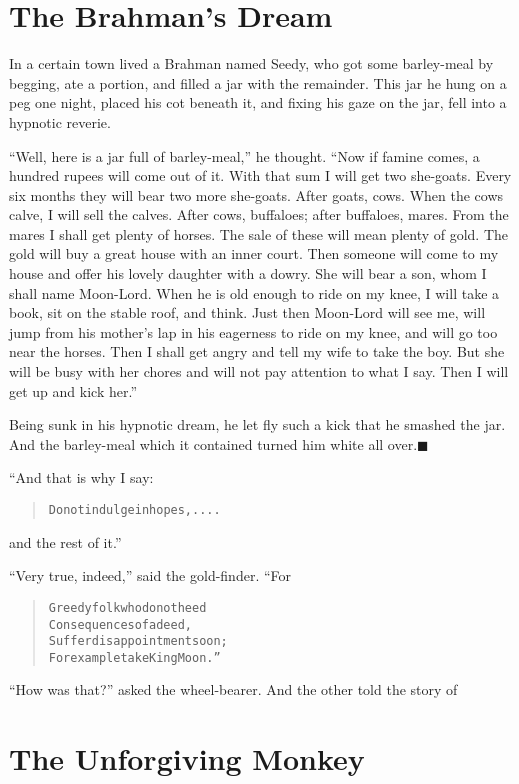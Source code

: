 \documentclass[article, twoside, 14pt]{memoir}
\newcommand{\qed}{\hfill \ensuremath{\blacksquare}}
\renewenvironment{verbatim}{%
\begin{quote}%
\vskip -10pt%
\begin{alltt}\normalfont\large}{\end{alltt}%
\end{quote}%
\vskip -10pt
} %
\begin{document}
\chapter{The Brahman's Dream}

\label{s86}

In a certain town lived a Brahman named Seedy, who got some
barley-meal by begging, ate a portion, and filled a jar with the
remainder. This jar he hung on a peg one night, placed his cot
beneath it, and fixing his gaze on the jar, fell into a hypnotic
reverie.

``Well, here is a jar full of barley-meal,'' he thought.
``Now if famine comes, a hundred rupees will come out of it. With that sum I will get two she-goats. Every six months they will bear two more she-goats. After goats, cows. When the cows calve, I will sell the calves. After cows, buffaloes; after buffaloes, mares. From the mares I shall get plenty of horses. The sale of these will mean plenty of gold. The gold will buy a great house with an inner court. Then someone will come to my house and offer his lovely daughter with a dowry. She will bear a son, whom I shall name Moon-Lord. When he is old enough to ride on my knee, I will take a book, sit on the stable roof, and think. Just then Moon-Lord will see me, will jump from his mother's lap in his eagerness to ride on my knee, and will go too near the horses. Then I shall get angry and tell my wife to take the boy. But she will be busy with her chores and will not pay attention to what I say. Then I will get up and kick her.''

Being sunk in his hypnotic dream, he let fly such a kick that he
smashed the jar. And the barley-meal which it contained turned him
white all over.\hyperref[s86]{\qed}

“And that is why I say:

\begin{verbatim}
Do not indulge in hopes, ....
\end{verbatim}
and the rest of it.”

``Very true, indeed,'' said the gold-finder. “For

\begin{verbatim}
Greedy folk who do not heed
Consequences of a deed,
Suffer disappointment soon;
For example take King Moon.”
\end{verbatim}
``How was that?'' asked the wheel-bearer. And the other told the
story of

\chapter{The Unforgiving Monkey}
\end{document}
